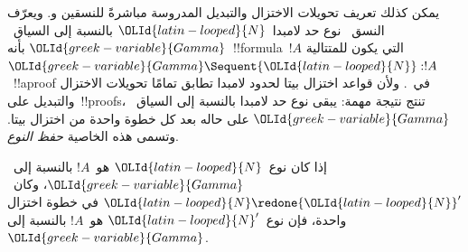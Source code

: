 \documentclass[../../../include/open-logic-section]{subfiles}
\begin{document}


يمكن كذلك تعريف تحويلات الاختزال والتبديل المدروسة مباشرةً للنسقين
 و. ويعرّف النسق~ نوع حد لامبدا~${\OLId{latin-looped}{N}}$ بالنسبة
إلى السياق~${\OLId{greek-variable}{Gamma}}$ بأنه~!!{formula}~$!A$ التي يكون للمتتالية
${\OLId{greek-variable}{Gamma}}\Sequent {\OLId{latin-looped}{N}}:!A$~!!a{proof} في~. ولأن قواعد اختزال بيتا
لحدود لامبدا تطابق تمامًا تحويلات الاختزال والتبديل على~!!{proof}s، تنتج
نتيجة مهمة: يبقى نوع حد لامبدا بالنسبة إلى السياق~${\OLId{greek-variable}{Gamma}}$ على حاله بعد
كل خطوة واحدة من اختزال بيتا. وتسمى هذه الخاصية \emph{حفظ النوع}.

\begin{prop}
إذا كان نوع~${\OLId{latin-looped}{N}}$ هو~$!A$ بالنسبة إلى~${\OLId{greek-variable}{Gamma}}$، وكان~${\OLId{latin-looped}{N}}\redone {\OLId{latin-looped}{N}}'$ في خطوة
اختزال واحدة، فإن نوع~${\OLId{latin-looped}{N}}'$ هو~$!A$ بالنسبة إلى~${\OLId{greek-variable}{Gamma}}$.
\end{prop}
\end{document}
